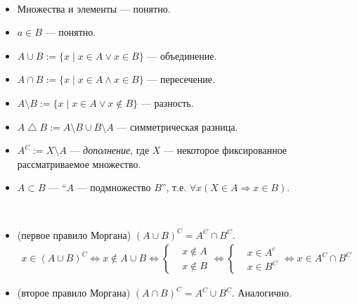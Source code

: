\documentclass[12pt,a4paper]{article}
\begin{document}
    \begin{definition}\ 
        \begin{itemize}
            \item Множества и элементы --- понятно.
            \item $a \in B$ --- понятно.
            \item $A \cup B := \{x \mid x\in A \vee x\in B\}$ --- объединение.
            \item $A \cap B := \{x \mid x\in A \wedge x\in B\}$ --- пересечение.
            \item $A \setminus B := \{x \mid x\in A \vee x\notin B\}$ --- разность.
            \item $A \bigtriangleup B := A \setminus B \cup B \setminus A$ --- симметрическая разница.
            \item $A^C := X\setminus A$ --- \emph{дополнение}, где $X$ --- некоторое фиксированное рассматриваемое множество.
            \item $A \subset B$ --- ``$A$ --- подмножество $B$'', т.е. $\forall x (X\in A \Rightarrow x\in B)$.
        \end{itemize}
    \end{definition}

    \begin{corollary*}\ 
        \begin{itemize}
            \item (первое правило Моргана) $(A\cup B)^C = A^C \cap B^C$.
                \begin{align*}
                    x\in (A\cup B)^C \Leftrightarrow
                    x \notin A \cup B \Leftrightarrow
                    \left\{ \begin{aligned}
                        &x \notin A\\
                        &x \notin B
                    \end{aligned}\right. \Leftrightarrow
                    \left\{ \begin{aligned}
                        &x \in A^c\\
                        &x \in B^C
                    \end{aligned} \right. \Leftrightarrow
                    x \in A^C \cap B^C
                \end{align*}
            \item (второе правило Моргана) $(A\cap B)^C = A^C \cup B^C$. Аналогично.
        \end{itemize}
    \end{corollary*}
\end{document}
